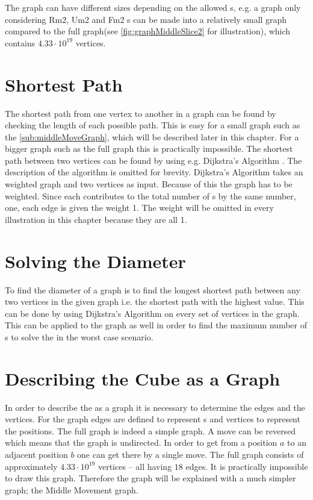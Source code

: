 The \rubik{} graph can have different sizes depending on the allowed \twist{}s, e.g. a graph only considering Rm2, Um2 and Fm2 \twist{}s can be made into a relatively small graph compared to the full \rubik{} graph(see \ref{fig:graphMiddleSlice2} for illustration), which contains $4.33 \cdot 10^{19}$ vertices.


\section{Shortest Path}
The shortest path from one vertex to another in a graph can be found by checking the length of each possible path. 
This is easy for a small graph such as the  \ref{sub:middleMoveGraph}, which will be described later in this chapter. For a bigger graph such as the full \rubik{} graph this is practically impossible. 
The shortest path between two vertices can be found by using e.g. Dijkstra's Algorithm \cite[p. 651]{Rosen07}. The description of the algorithm is omitted for brevity. Dijkstra's Algorithm takes an weighted graph and two vertices as input. 
Because of this the \rubik{} graph has to be weighted. Since each \twist{} contributes to the total number of \twist{}s by the same number, one, each edge is given the weight 1. The weight will be omitted in every illustration in this chapter because they are all 1.  

\section{Solving the Diameter}
To find the diameter of a graph is to find the longest shortest path between any two vertices in the given graph i.e. the shortest path with the highest value. 
This can be done by using Dijkstra's Algorithm on every set of vertices in the graph. 
This can be applied to the \rubik{} graph as well in order to find the maximum number of \twist{}s to solve the \rubik{} in the worst case scenario. %


\section{Describing the Cube as a Graph}
In order to describe the \rubik{} as a graph it is necessary to determine the edges and the vertices. For the \rubik{} graph edges are defined to represent \twist{}s and vertices to represent the positions. 
The full \rubik{} graph is indeed a simple graph. A move can be reversed which means that the graph is undirected. In order to get from a position $a$ to an adjacent position $b$ one can get there by a single move. 
The full \rubik{} graph consists of approximately $4.33\cdot10^{19}$ vertices -- all having $18$ edges.
It is practically impossible to draw this graph. Therefore the graph will be explained with a much simpler graph; the Middle Movement graph.


